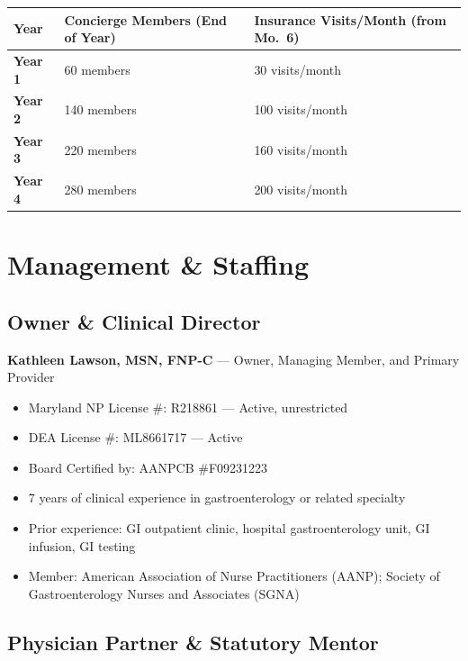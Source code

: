 \documentclass[11pt,letterpaper]{article}
\newcommand{\thead}[1]{\cellcolor{navy}\color{white}\bfseries\small #1}
\newcommand{\trow}{\rowcolor{rowshade}}
\newcommand{\ownername}{Kathleen Lawson}
\newcommand{\ownerfullcredentials}{MSN, FNP-C}
\newcommand{\ownerlicense}{R218861}
\newcommand{\ownerdealicense}{ML8661717}
\newcommand{\ownerboardcert}{AANPCB \#F09231223}
\newcommand{\owneryearsofexperience}{7}
\begin{document}
\vspace{6pt}
\begin{tabularx}{\linewidth}{|>{\bfseries}l|X|X|}
\hline
\thead{Year} & \thead{Concierge Members (End of Year)} & \thead{Insurance Visits/Month (from Mo.\ 6)} \\
\hline
\trow Year 1 & 60 members & 30 visits/month \\
Year 2 & 140 members & 100 visits/month \\
\trow Year 3 & 220 members & 160 visits/month \\
Year 4 & 280 members & 200 visits/month \\
\hline
\end{tabularx}

\newpage

\section{Management \& Staffing}

\subsection{Owner \& Clinical Director}

\textbf{\ownername, \ownerfullcredentials} --- Owner, Managing Member, and Primary Provider

\begin{itemize}
  \item Maryland NP License \#: \ownerlicense{} --- Active, unrestricted
  \item DEA License \#: \ownerdealicense{} --- Active
  \item Board Certified by: \ownerboardcert
  \item \owneryearsofexperience{}  years of clinical experience in gastroenterology or related specialty
  \item Prior experience: GI outpatient clinic, hospital gastroenterology unit, GI infusion, GI testing
  \item Member: American Association of Nurse Practitioners (AANP); Society of Gastroenterology Nurses and Associates (SGNA)
\end{itemize}

\subsection{Physician Partner \& Statutory Mentor}
\end{document}
